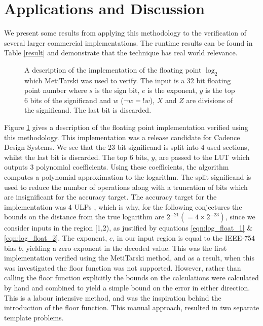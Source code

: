 \documentclass{fac}
\begin{document}
\section{Applications and Discussion}
\label{Apps}
We present some results from applying this methodology to the verification of several larger commercial implementations. The runtime results can be found in Table \ref{result} and demonstrate that the technique has real world relevance.

\begin{figure}
\centering

\caption{A description of the implementation of the floating point $\log_2$ which MetiTarski was used to verify. The input is a 32 bit floating point number where $s$ is the sign bit, $e$ is the exponent, $y$ is the top 6 bits of the significand and $w$ ($\neg{w} = !w$), $X$ and $Z$ are divisions of the significand. The last bit is discarded.\label{block_diagram}}
\end{figure}

Figure \ref{block_diagram} gives a description of the floating point implementation verified using this methodology. This implementation was a release candidate for Cadence Design Systems. We see that the 23 bit significand is split into 4 used sections, whilst the last bit is discarded. The top 6 bits, $y$, are passed to the LUT which outputs 3 polynomial coefficients. Using these coefficients, the algorithm computes a polynomial approximation to the logarithm. The split significand is used to reduce the number of operations along with a truncation of bits which are insignificant for the accuracy target. The accuracy target for the implementation was 4 ULPs \cite{muller2010handbook}, which is why, for the following conjectures the bounds on the distance from the true logarithm are $2^{-21}(=4\times 2^{-23})$, since we consider inputs in the region [1,2), as justified by equations \ref{eqn:log_float_1} \& \ref{eqn:log_float_2}. The exponent, $e$, in our input region is equal to the IEEE-754 bias $b$, yielding a zero exponent in the decoded value. This was the first implementation verified using the MetiTarski method, and as a result, when this was investigated the floor function was not supported. However, rather than calling the floor function explicitly the bounds on the calculations were calculated by hand and combined to yield a simple bound on the error in either direction. This is a labour intensive method, and was the inspiration behind the introduction of the floor function. This manual approach, resulted in two separate template problems. 
\end{document}
